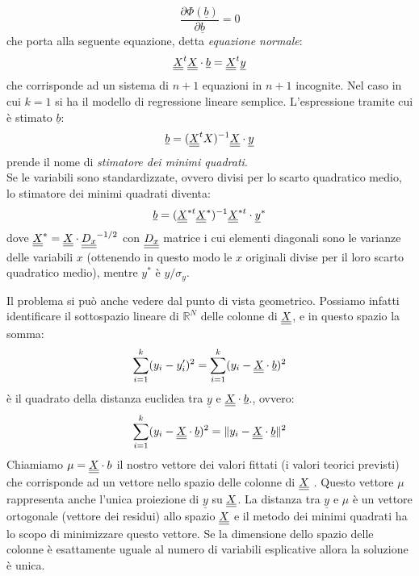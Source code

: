 \begin{equation}
\frac{\partial \Phi(\underline{b})}{\partial \underline{b}} = 0
\end{equation}
che porta alla seguente equazione, detta \textit{equazione normale}:
\begin{equation}
\underline{\underline{X}}^t \underline{\underline{X}} \cdot \underline{b} = \underline{\underline{X}}^t \underline{y}
\end{equation}
che corrisponde ad un sistema di $n+1$ equazioni in $n+1$ incognite. Nel caso in cui $k = 1$ si ha il modello di regressione lineare semplice. L'espressione tramite cui è stimato $\underline{b}$:
\begin{equation}
\underline{b} = (\underline{\underline{X}}^t X)^{-1} \underline{\underline{X}} \cdot \underline{y}
\end{equation}
prende il nome di \textit{stimatore dei minimi quadrati}.\\
Se le variabili sono standardizzate, ovvero divisi per lo scarto quadratico medio, lo stimatore dei minimi quadrati diventa:
\begin{equation}
\underline{b} = (\underline{\underline{X}}^{*t} \underline{\underline{X}}^*)^{-1} \underline{\underline{X}}^{*t} \cdot \underline{y}^*
\end{equation}
dove $\underline{\underline{X}}^* = \underline{\underline{X}} \cdot \underline{\underline{D_x}}^{-1/2}$ con $\underline{\underline{D_x}}$ matrice i cui elementi diagonali sono le varianze delle variabili $x$ (ottenendo in questo modo le $x$ originali divise per il loro scarto quadratico medio), mentre $y^*$ è $y/\sigma_y$.

Il problema si può anche vedere dal punto di vista geometrico. Possiamo infatti identificare il sottospazio lineare di $\mathbb{R}^N$ delle colonne di $\underline{\underline{X}}$, e in questo spazio la somma:
\begin{equation}
\sum_{i=1}^k (y_i - y'_i)^2 = \sum_{i=1}^k (y_i - \underline{\underline{X}} \cdot \underline{b})^2
\end{equation}
è il quadrato della distanza euclidea tra $\underline{y}$ e $\underline{\underline{X}} \cdot \underline{b}$., ovvero:
\begin{equation}
\sum_{i=1}^k (y_i - \underline{\underline{X}} \cdot \underline{b})^2 = \| y_i - \underline{\underline{X}} \cdot \underline{b} \|^2
\end{equation}
Chiamiamo $\mu = \underline{\underline{X}} \cdot b$ il nostro vettore dei valori fittati (i valori teorici previsti) che corrisponde ad un vettore nello spazio delle colonne di $\underline{\underline{X}}$ . Questo vettore $\mu$ rappresenta anche l'unica proiezione di $\underline{y}$ su $\underline{\underline{X}}$. La distanza tra $\underline{y}$ e $\mu$ è un vettore ortogonale (vettore dei residui) allo spazio $\underline{\underline{X}}$ e il metodo dei minimi quadrati ha lo scopo di minimizzare questo vettore. Se la dimensione dello spazio delle colonne è esattamente uguale al numero di variabili esplicative allora la soluzione è unica.
